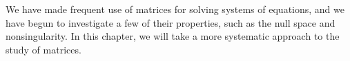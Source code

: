 We have made frequent use of matrices for solving systems of equations, and we have begun to investigate a few of their properties, such as the null space and nonsingularity.  In this chapter, we will take a more systematic approach to the study of matrices.